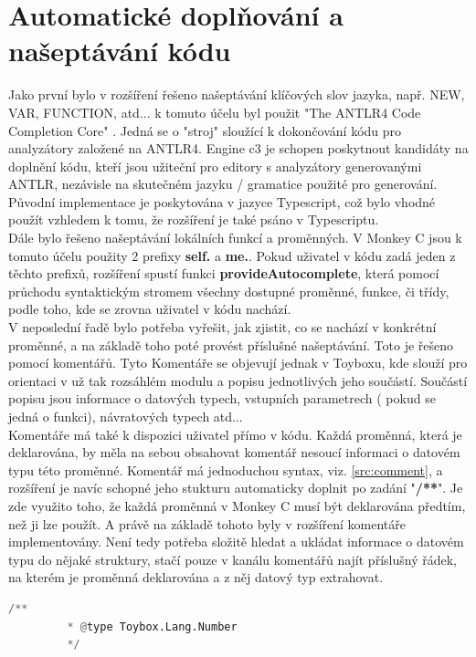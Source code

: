 \section{Automatické doplňování a našeptávání kódu} \label{55section}
Jako první bylo v rozšíření řešeno našeptávání klíčových slov jazyka, např. NEW, VAR, FUNCTION, atd... k tomuto účelu byl použit "The ANTLR4 Code Completion Core"  \cite{mike_lischke}. Jedná se o "stroj"  sloužící k dokončování kódu pro analyzátory založené na ANTLR4. Engine c3 je schopen poskytnout kandidáty na doplnění kódu, kteří jsou užiteční pro editory s analyzátory generovanými ANTLR, nezávisle na skutečném jazyku / gramatice použité pro generování. Původní implementace je poskytována v jazyce Typescript, což bylo vhodné použít vzhledem k tomu, že rozšíření je také psáno v Typescriptu.
\\
Dále bylo řešeno našeptávání lokálních funkcí a proměnných. V Monkey C jsou k tomuto účelu použity 2 prefixy \textbf{self.} a \textbf{me.}. Pokud uživatel v kódu zadá jeden z těchto prefixů, rozšíření spustí funkci \textbf{provideAutocomplete}, která pomocí průchodu syntaktickým stromem všechny dostupné proměnné, funkce, či třídy, podle toho, kde se zrovna uživatel v kódu nachází.
\\
V neposlední řadě bylo potřeba vyřešit, jak zjistit, co se nachází v konkrétní proměnné, a na základě toho poté provést příslušné našeptávání. Toto je řešeno  pomocí komentářů. Tyto Komentáře se objevují jednak v Toyboxu, kde slouží pro orientaci v už tak rozsáhlém modulu a popisu jednotlivých jeho součástí. Součástí popisu jsou informace o datových typech, vstupních parametrech ( pokud se jedná o funkci), návratových typech atd...  
\\
Komentáře má také k dispozici uživatel přímo v kódu. Každá proměnná, která je deklarována, by měla na sebou obsahovat komentář nesoucí informaci o datovém typu této proměnné. Komentář má jednoduchou syntax, viz. \ref{src:comment}, a rozšíření je navíc schopné jeho stukturu automaticky doplnit po zadání "\textbf{/**}". Je zde využito toho, že každá proměnná v Monkey C musí být deklarována předtím, než ji lze použít. A právě na základě tohoto byly v rozšíření komentáře implementovány. Není tedy potřeba složitě hledat a ukládat informace o datovém typu do nějaké struktury, stačí pouze v kanálu komentářů najít příslušný řádek, na kterém je proměnná deklarována a z něj datový typ extrahovat.

\begin{lstlisting}[language=Python,label=src:comment,caption={struktura komentáře datový typ}]
        /**
         * @type Toybox.Lang.Number
         */
\end{lstlisting}


